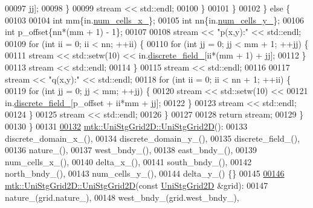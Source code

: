 \begin{DoxyCode}
00097 jj];
00098         \}
00099         stream << std::endl;
00100       \}
00101     \}
00102   \} \textcolor{keywordflow}{else} \{
00103 
00104     \textcolor{keywordtype}{int} mm\{in.\hyperlink{classmtk_1_1UniStgGrid2D_ac03a0f4840ee6ae1bc853e5d9c0df8d1}{num\_cells\_x\_}\};
00105     \textcolor{keywordtype}{int} nn\{in.\hyperlink{classmtk_1_1UniStgGrid2D_a3e4f61d781212ad57c34e9446c4074b6}{num\_cells\_y\_}\};
00106     \textcolor{keywordtype}{int} p\_offset\{nn*(mm + 1) - 1\};
00107 
00108     stream << \textcolor{stringliteral}{"p(x,y):"} << std::endl;
00109     \textcolor{keywordflow}{for} (\textcolor{keywordtype}{int} ii = 0; ii < nn; ++ii) \{
00110       \textcolor{keywordflow}{for} (\textcolor{keywordtype}{int} jj = 0; jj < mm + 1; ++jj) \{
00111         stream << std::setw(10) << in.\hyperlink{classmtk_1_1UniStgGrid2D_ad7474b2669ee988b84aed20b7f5dc7be}{discrete\_field\_}[ii*(mm + 1) + jj];
00112       \}
00113       stream << std::endl;
00114     \}
00115     stream << std::endl;
00116 
00117     stream << \textcolor{stringliteral}{"q(x,y):"} << std::endl;
00118     \textcolor{keywordflow}{for} (\textcolor{keywordtype}{int} ii = 0; ii < nn + 1; ++ii) \{
00119       \textcolor{keywordflow}{for} (\textcolor{keywordtype}{int} jj = 0; jj < mm; ++jj) \{
00120         stream << std::setw(10) <<
00121           in.\hyperlink{classmtk_1_1UniStgGrid2D_ad7474b2669ee988b84aed20b7f5dc7be}{discrete\_field\_}[p\_offset + ii*mm + jj];
00122       \}
00123       stream << std::endl;
00124     \}
00125     stream << std::endl;
00126   \}
00127 
00128   \textcolor{keywordflow}{return} stream;
00129 \}
00130 \}
00131 
\hypertarget{mtk__uni__stg__grid__2d_8cc_source_l00132}{}\hyperlink{classmtk_1_1UniStgGrid2D_a40db9a6d21e0f4cf70c478fcc3b94531}{00132} \hyperlink{classmtk_1_1UniStgGrid2D_a40db9a6d21e0f4cf70c478fcc3b94531}{mtk::UniStgGrid2D::UniStgGrid2D}():
00133     discrete\_domain\_x\_(),
00134     discrete\_domain\_y\_(),
00135     discrete\_field\_(),
00136     nature\_(),
00137     west\_bndy\_(),
00138     east\_bndy\_(),
00139     num\_cells\_x\_(),
00140     delta\_x\_(),
00141     south\_bndy\_(),
00142     north\_bndy\_(),
00143     num\_cells\_y\_(),
00144     delta\_y\_() \{\}
00145 
\hypertarget{mtk__uni__stg__grid__2d_8cc_source_l00146}{}\hyperlink{classmtk_1_1UniStgGrid2D_aab6e54b48c3f32de808460ef46f598d4}{00146} \hyperlink{classmtk_1_1UniStgGrid2D_a40db9a6d21e0f4cf70c478fcc3b94531}{mtk::UniStgGrid2D::UniStgGrid2D}(\textcolor{keyword}{const} 
      \hyperlink{classmtk_1_1UniStgGrid2D}{UniStgGrid2D} &grid):
00147     nature\_(grid.nature\_),
00148     west\_bndy\_(grid.west\_bndy\_),

\end{DoxyCode}
